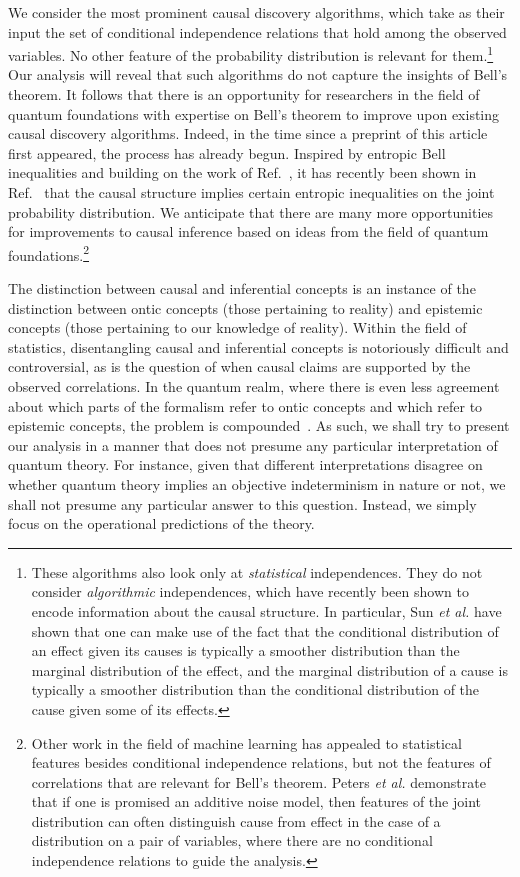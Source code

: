 \documentclass[12pt,onecolumn,nofootinbib]{revtex4-2}
\begin{document}
 
We consider the most prominent causal discovery algorithms, which take as their input the set of conditional independence relations that hold among the observed variables.  No other feature of the probability distribution is relevant for them.\footnote{These algorithms also look only at \emph{statistical} independences.  They do not consider \emph{algorithmic} independences, which have recently been shown to encode information about the causal structure.  In particular, Sun \emph{et al.}\cite{Sun} have shown that one can make use of the fact that the conditional distribution of an effect given its causes is typically a smoother distribution than the marginal distribution of the effect, and the marginal distribution of a cause is typically a smoother distribution than the conditional distribution of the cause given some of its effects.}
Our analysis will reveal that such algorithms do not capture the insights of Bell's theorem.  It follows that there is an opportunity for researchers in the field of quantum foundations with expertise on Bell's theorem to improve upon existing causal discovery algorithms.   
Indeed, in the time since a preprint of this article first appeared, the process has already begun. 
Inspired by entropic Bell inequalities and building on the work of Ref.~\cite{FritzChaves}, it has recently been shown in Ref.~\cite{Chavesetal} that the causal structure implies certain entropic inequalities on the joint probability distribution.  We anticipate that there are many more opportunities for improvements to causal inference 
based on ideas from the field of quantum foundations.\footnote{Other work in the field of machine learning has appealed to statistical features besides conditional independence relations, but not the features of correlations that are relevant for Bell's theorem.  Peters \emph{et al.}\cite{Peters} demonstrate that if one is promised an additive noise model, then features of the joint distribution can often distinguish cause from effect in the case of a  distribution on a pair of variables, where there are no conditional independence relations to guide the analysis.}

The distinction between causal and inferential concepts is an instance of
the distinction between ontic concepts (those pertaining to reality) and
epistemic concepts (those pertaining to our knowledge of reality).  Within
the field of statistics, disentangling causal and inferential concepts is
notoriously difficult and controversial, as is the question of when causal
claims are supported by the observed correlations. In the quantum realm,
where there is even less agreement about which parts of the formalism refer
to ontic concepts and which refer to epistemic concepts, the problem is
compounded~\cite{Harrigan2010}.  As such, we shall try to present our analysis in
a manner that does not presume any particular interpretation of quantum
theory.  For instance, given that different interpretations disagree on
whether quantum theory implies an objective indeterminism in nature or not,
we shall not presume any particular answer to this question.  Instead, we
simply focus on the operational predictions of the theory. 
\end{document}
